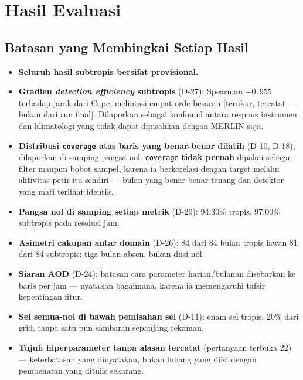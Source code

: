 \section{Hasil Evaluasi}

\subsection{Batasan yang Membingkai Setiap Hasil}


\begin{itemize}
    \item \textbf{Seluruh hasil subtropis bersifat provisional.}
    \item \textbf{Gradien \textit{detection efficiency} subtropis} (D-27):
          Spearman $-0,955$ terhadap jarak dari Cape, melintasi empat orde
          besaran [terukur, tercatat --- bukan dari run final]. Dilaporkan
          sebagai konfound antara respons instrumen dan klimatologi yang tidak
          dapat dipisahkan dengan MERLIN saja.
    \item \textbf{Distribusi \texttt{coverage} atas baris yang benar-benar
          dilatih} (D-10, D-18), dilaporkan di samping pangsa nol.
          \texttt{coverage} \textbf{tidak pernah} dipakai sebagai filter maupun
          bobot sampel, karena ia berkorelasi dengan target melalui aktivitas
          petir itu sendiri --- bulan yang benar-benar tenang dan detektor yang
          mati terlihat identik.
    \item \textbf{Pangsa nol di samping setiap metrik} (D-20): 94,30\% tropis,
          97,00\% subtropis pada resolusi jam.
    \item \textbf{Asimetri cakupan antar domain} (D-26): 84 dari 84 bulan tropis
          lawan 81 dari 84 subtropis; tiga bulan absen, bukan diisi nol.
    \item \textbf{Siaran AOD} (D-24): batasan cara parameter harian/bulanan
          disebarkan ke baris per jam --- nyatakan bagaimana, karena ia
          memengaruhi tafsir kepentingan fitur.
    \item \textbf{Sel semua-nol di bawah pemisahan sel} (D-11): enam sel tropis,
          20\% dari grid, tanpa satu pun sambaran sepanjang rekaman.
    \item \textbf{Tujuh hiperparameter tanpa alasan tercatat} (pertanyaan
          terbuka 22) --- keterbatasan yang dinyatakan, bukan lubang yang diisi
          dengan pembenaran yang ditulis sekarang.
\end{itemize}

